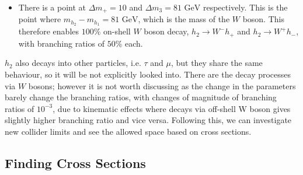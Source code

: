 \documentclass[12pt]{article}
\begin{document}
\begin{itemize}
    \item There is a point at $\Delta m_+= 10$ and $\Delta m_3=81 \text{ GeV}$ respectively. This is the point where $m_{h_2} - m_{h_1} = 81 \text{ GeV}$, which is the mass of the $W$ boson. This therefore enables $100\%$ on-shell $W$ boson decay, $h_2 \rightarrow W^- h_+$ and $h_2 \rightarrow W^+ h_-$, with branching ratios of $50\%$ each. 
\end{itemize}

$h_2$ also decays into other particles, i.e. $\tau$ and $\mu$, but they share the same behaviour, so it will be not explicitly looked into. There are the decay processes via $W$ bosons; however it is not worth discussing as the change in the parameters barely change the branching ratios, with changes of magnitude of branching ratios of $10^{-3}$, due to kinematic effects where decays via off-shell W boson gives slightly higher branching ratio and vice versa. Following this, we can investigate new collider limits and see the allowed space based on cross sections.


\subsection{Finding Cross Sections}
\end{document}
